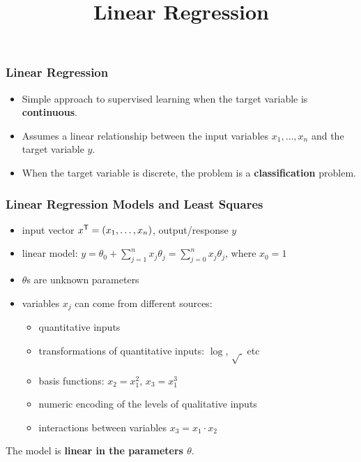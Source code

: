 \documentclass[xcolor=table]{beamer}
\title{Linear Regression}
\newcommand{\trans}[1]{\ensuremath{#1}^{\footnotesize{\textsf{T}}}}
\begin{document}
\maketitle

\begin{frame}[t]
  \frametitle{Linear Regression}  
\begin{itemize}
    \item Simple approach to supervised learning when the target variable is 
        \textbf{continuous}.
    \item Assumes a linear relationship between the input variables 
        $x_1, \ldots, x_n$ and the target variable $y$.
    \item  When the target variable is discrete, the problem is a
    \textbf{classification}
        problem. 
  \end{itemize}
\end{frame}


\begin{frame}[t]
\frametitle{Linear Regression Models and Least Squares}
\begin{itemize}
    \item input vector $\trans{x} = (x_1, \ldots, x_n)$, output/response $y$
    \item linear model: $y = \theta_0 + \sum_{j=1}^{n} x_j \theta_j = \sum_{j = 0}^n
    x_j \theta_j$, where $x_0 = 1$
    \item $\theta$s are unknown parameters
    \item variables $x_j$ can come from different sources:
        \begin{itemize}
            \item quantitative inputs
            \item transformations of quantitative inputs: $\log$, $\sqrt{~}$ etc
            \item basis functions: $x_2 = x_1^2$, $x_3 = x_1^3$
            \item numeric encoding of the levels of qualitative inputs
            \item interactions between variables $x_3 = x_1 \cdot x_2$
        \end{itemize}
\end{itemize}
The model is \textbf{linear in the parameters $\theta$}.
\end{frame}
\end{document}
